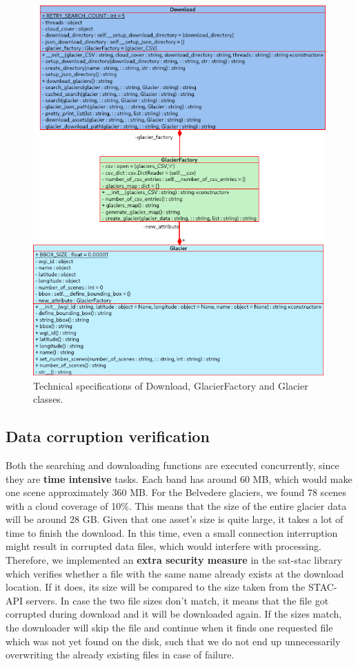 \documentclass[12pt, a4paper]{report}
\begin{document}
	\begin{figure}[h!]
		\centering
		\includegraphics[scale=0.6]{../images/sd_diagram.png}
		\caption{Technical specifications of Download, GlacierFactory and Glacier classes.}
		\label{fig:sd_diagram}
	\end{figure}

	\subsection{Data corruption verification}
	Both the searching and downloading functions are executed concurrently, since they are \textbf{time intensive} tasks. Each band has around 60 MB, which would make one scene approximately 360 MB. For the Belvedere glaciers, we found 78 scenes with a cloud coverage of 10\%. This means that the size of the entire glacier data will be around 28 GB. Given that one asset's size is quite large, it takes a lot of time to finish the download. In this time, even a small connection interruption might result in corrupted data files, which would interfere with processing. Therefore, we implemented an \textbf{extra security measure} in the sat-stac library which verifies whether a file with the same name already exists at the download location. If it does, its size will be compared to the size taken from the STAC-API servers. In case the two file sizes don't match, it means that the file got corrupted during download and it will be downloaded again. If the sizes match, the downloader will skip the file and continue when it finds one requested file which was not yet found on the disk, such that we do not end up unnecessarily overwriting the already existing files in case of failure.
	
\end{document}
